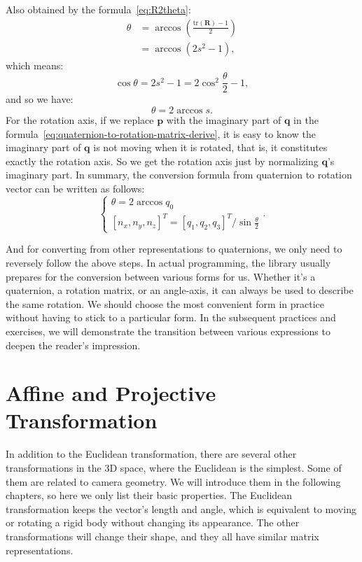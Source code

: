 Also obtained by the formula~\eqref{eq:R2theta}:
\begin{equation}
	\begin{aligned}
		\theta &= \arccos(\frac{\mathrm{tr}(\mathbf{R})-1}{2}) \\
		&=\arccos(2s^2-1),
	\end{aligned}
\end{equation}
which means:
\begin{equation}
	\cos \theta =2s^2-1=2 \cos^2 \frac{\theta}{2} -1,
\end{equation}
and so we have:
\begin{equation}
	\theta = 2 \arccos s.
\end{equation}
For the rotation axis, if we replace $\mathbf{p}$ with the imaginary part of $\mathbf{q}$ in the formula~\eqref{eq:quaternion-to-rotation-matrix-derive}, it is easy to know the imaginary part of  $\mathbf{q}$ is not moving when it is rotated, that is, it constitutes exactly the rotation axis. So we get the rotation axis just by normalizing $\mathbf{q}$'s imaginary part. In summary, the conversion formula from quaternion to rotation vector can be written as follows:
\begin{equation}
	\label{eq:rotationVector2Quaternion}
	\begin{cases}
		\theta = 2\arccos {q_0}\\
		{\left[ {{n_x},{n_y},{n_z}} \right]^T} = {{{\left[ {{q_1},{q_2},{q_3}} \right] }^T}}/{\sin \frac{\theta }{2}}
	\end{cases} .
\end{equation}

And for converting from other representations to quaternions, we only need to reversely follow the above steps. In actual programming, the library usually prepares for the conversion between various forms for us. Whether it's a quaternion, a rotation matrix, or an angle-axis, it can always be used to describe the same rotation. We should choose the most convenient form in practice without having to stick to a particular form. In the subsequent practices and exercises, we will demonstrate the transition between various expressions to deepen the reader's impression.

\section{Affine and Projective Transformation}
In addition to the Euclidean transformation, there are several other transformations in the 3D space, where the Euclidean is the simplest. Some of them are related to camera geometry. We will introduce them in the following chapters, so here we only list their basic properties. The Euclidean transformation keeps the vector's length and angle, which is equivalent to moving or rotating a rigid body without changing its appearance. The other transformations will change their shape, and they all have similar matrix representations.

